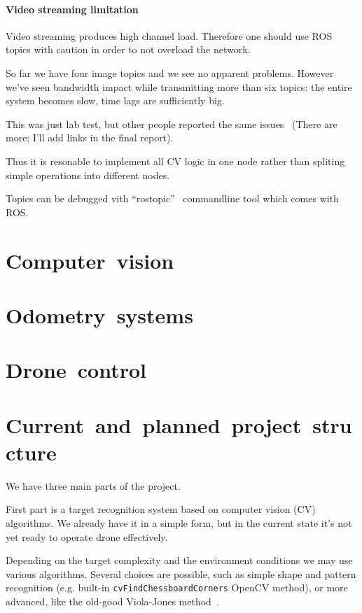 \documentclass[11pt]{article}
\begin{document}
    \paragraph{Video streaming limitation} Video streaming produces high channel load.
    Therefore one should use ROS topics with caution
    in order to not overload the network.

    So far we have four image topics and we see no apparent problems.
    However we've seen bandwidth impact while transmitting more than six topics:
    the entire system becomes slow, time lags are sufficiently big.

    This was just lab test, but other people reported the same issues~\cite{BandwidthProblems}
    (There are more; I'll add links in the final report).

    Thus it is resonable to implement all CV logic in one node rather than
    spliting simple operations into different nodes.

    Topics can be debugged vith ``rostopic''~\cite{rostopic} commandline tool
    which comes with ROS.

    \section{Computer~vision}

    \section{Odometry~systems}

    \section{Drone~control}

    \section{Current~and~planned~project~structure}

    We have three main parts of the project.

    First part is a target recognition system based on computer vision (CV)
    algorithms.
    We already have it in a simple form, but in the current state it's not yet
    ready to operate drone effectively.

    Depending on the target complexity and the environment conditions
    we may use various algorithms. Several choices are possible, such as
    simple shape and pattern recognition
    (e.g. built-in {\tt cvFindChessboardCorners} OpenCV method),
    or more advanced, like the old-good Viola-Jones
    method~\cite{HaarCascade}.
\end{document}
